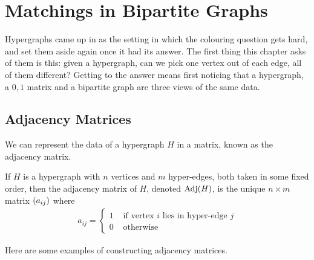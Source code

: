 \section{Matchings in Bipartite Graphs}

Hypergraphs came up in  as the setting in which the colouring question gets hard, and  set them aside again once it had its answer. The first thing this chapter asks of them is this: given a hypergraph, can we pick one vertex out of each edge, all of them different? Getting to the answer means first noticing that a hypergraph, a $0,1$ matrix and a bipartite graph are three views of the same data.

\subsection{Adjacency Matrices}

We can represent the data of a hypergraph $H$ in a matrix, known as the adjacency matrix.

\begin{boxdefinition}
    If $H$ is a hypergraph with $n$ vertices and $m$ hyper-edges, both taken in some fixed order, then the adjacency matrix of $H$, denoted $\operatorname{Adj}(H)$, is the unique $n \times m$ matrix $\left( a_{ij} \right)$ where
    \begin{align*}
        a_{ij} =
        \begin{cases}
            1 & \text{ if vertex $i$ lies in hyper-edge $j$} \\
            0 & \text{ otherwise}
        \end{cases}
    \end{align*}
\end{boxdefinition}

Here are some examples of constructing adjacency matrices.

